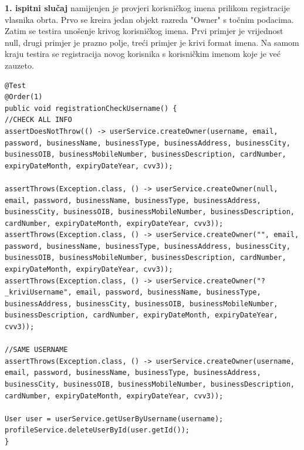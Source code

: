    			\textbf{1. ispitni slučaj}{ namijenjen je provjeri korisničkog imena prilikom registracije vlasnika obrta. Prvo se kreira jedan objekt razreda "Owner" s točnim podacima. Zatim se testira unošenje krivog korisničkog imena. Prvi primjer je vrijednost null, drugi primjer je prazno polje, treći primjer je krivi format imena. Na samom kraju testira se registracija novog korisnika s korisničkim imenom koje je već zauzeto.}
           \begin{lstlisting}
@Test
@Order(1)
public void registrationCheckUsername() {
//CHECK ALL INFO
assertDoesNotThrow(() -> userService.createOwner(username, email, password, businessName, businessType, businessAddress, businessCity, businessOIB, businessMobileNumber, businessDescription, cardNumber, expiryDateMonth, expiryDateYear, cvv3));

assertThrows(Exception.class, () -> userService.createOwner(null, email, password, businessName, businessType, businessAddress, businessCity, businessOIB, businessMobileNumber, businessDescription, cardNumber, expiryDateMonth, expiryDateYear, cvv3));
assertThrows(Exception.class, () -> userService.createOwner("", email, password, businessName, businessType, businessAddress, businessCity, businessOIB, businessMobileNumber, businessDescription, cardNumber, expiryDateMonth, expiryDateYear, cvv3));
assertThrows(Exception.class, () -> userService.createOwner("?_kriviUsername", email, password, businessName, businessType, businessAddress, businessCity, businessOIB, businessMobileNumber, businessDescription, cardNumber, expiryDateMonth, expiryDateYear, cvv3));

//SAME USERNAME
assertThrows(Exception.class, () -> userService.createOwner(username, email, password, businessName, businessType, businessAddress, businessCity, businessOIB, businessMobileNumber, businessDescription, cardNumber, expiryDateMonth, expiryDateYear, cvv3));

User user = userService.getUserByUsername(username);
profileService.deleteUserById(user.getId());
}
        \end{lstlisting}

